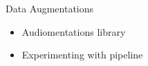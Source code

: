 



\begin{frame}{Data Augmentations}
    \begin{itemize}
        \item Audiomentations library
        \item Experimenting with pipeline
    \end{itemize}
\end{frame}


